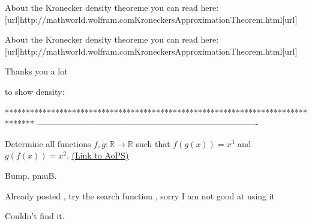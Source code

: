 \begin{solution}
	About the Kronecker density theoreme you can read here:
[url]http://mathworld.wolfram.com\/KroneckersApproximationTheorem.html[\/url]
\end{solution}



\begin{solution}
	\begin{tcolorbox}About the Kronecker density theoreme you can read here:
[url]http://mathworld.wolfram.com\/KroneckersApproximationTheorem.html[\/url]\end{tcolorbox}

Thanks you a lot
\end{solution}



\begin{solution}
	to show density:
\end{solution}
*******************************************************************************
-------------------------------------------------------------------------------

\begin{problem}
	Determine all functions $f,g:\mathbb{R}\rightarrow\mathbb{R}$ such that $f(g(x))=x^3$ and $g(f(x))=x^2$. 
	\flushright \href{https://artofproblemsolving.com/community/c6h1573398}{(Link to AoPS)}
\end{problem}



\begin{solution}
	Bump. pmuB.
\end{solution}



\begin{solution}
	Already posted , try the search function , sorry I am not good at using it 
\end{solution}



\begin{solution}
	Couldn't find it. 
\end{solution}



